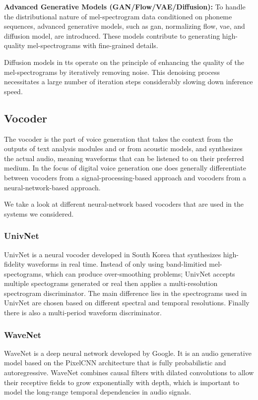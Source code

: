 \textbf{Advanced Generative Models (GAN/Flow/VAE/Diffusion):} To handle the distributional nature of mel-spectrogram data conditioned on phoneme sequences, advanced generative models, such as \gls{gan}, normalizing flow, \gls{vae}, and diffusion model, are introduced. These models contribute to generating high-quality mel-spectrograms with fine-grained details.

Diffusion models in \gls{tts} operate on the principle of enhancing the quality of the mel-spectrograms by iteratively removing noise. This denoising process necessitates a large number of iteration steps considerably slowing down inference speed\cite{acoustic2023models}.

\subsection{Vocoder}

The vocoder is the part of voice generation that takes the context from the outputs of text analysis modules and or from acoustic models, and synthesizes the actual audio, meaning waveforms that can be listened to on their preferred medium. In the focus of digital voice generation one does generally differentiate between vocoders from a signal-processing-based approach and vocoders from a neural-network-based approach\cite{Tan2023vocoder}.

We take a look at different neural-network based vocoders that are used in the systems we considered.

\subsubsection{UnivNet}

UnivNet is a neural vocoder developed in South Korea that synthesizes high-fidelity waveforms in real time. Instead of only using band-limitied mel-spectograms, which can produce over-smoothing problems; UnivNet accepts multiple spectograms generated or real then applies a multi-resolution spectrogram discriminator. The main difference lies in the spectrograms used in UnivNet are chosen based on different spectral and temporal resolutions. Finally there is also a multi-period waveform discriminator\cite{jang2021univnet}.

\subsubsection{WaveNet}

WaveNet is a deep neural network developed by Google. It is an audio generative model based on the PixelCNN architecture that is fully probabilistic and autoregressive. WaveNet combines causal filters with dilated convolutions to allow their receptive fields to grow exponentially with depth, which is important to model
the long-range temporal dependencies in audio signals\cite{oord2016wavenet}.

